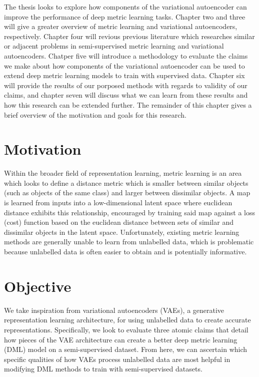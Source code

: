 \documentclass[./dissertation.tex]{subfiles}
\begin{document}
    The thesis looks to explore how components of the variational autoencoder can improve the performance of deep metric learning tasks. Chapter two and three will give a greater overview of metric learning and variational autoencoders, respectively. Chapter four will revious previous literature which researches similar or adjacent problems in semi-supervised metric learning and variational autoencoders. Chatper five will introduce a methodology to evaluate the claims we make about how components of the variational autoencoder can be used to extend deep metric learning models to train with supervised data. Chapter six will provide the results of our porposed methods with regards to validity of our claims, and chapter seven will discuss what we can learn from these results and how this research can be extended further. The remainder of this chapter gives a brief overview of the motivation and goals for this research. 

    \section{Motivation}
    Within the broader field of representation learning, metric learning is an area which looks to define a distance metric which is smaller between similar objects (such as objects of the same class) and larger between dissimilar objects. A map is learned from inputs into a low-dimensional latent space where euclidean distance exhibits this relationship, encouraged by training said map against a loss (cost) function based on the euclidean distance between sets of similar and dissimilar objects in the latent space. Unfortunately, existing metric learning methods are generally unable to learn from unlabelled data, which is problematic because unlabelled data is often easier to obtain and is potentially informative.

    \section{Objective}
    We take inspiration from variational autoencoders (VAEs), a generative representation learning architecture, for using unlabelled data to create accurate representations. Specifically, we look to evaluate three atomic claims that detail how pieces of the VAE architecture can create a better deep metric learning (DML) model on a semi-supervised dataset. From here, we can ascertain which specific qualities of how VAEs process unlabelled data are most helpful in modifying DML methods to train with semi-supervised datasets. \\
    
\end{document}
